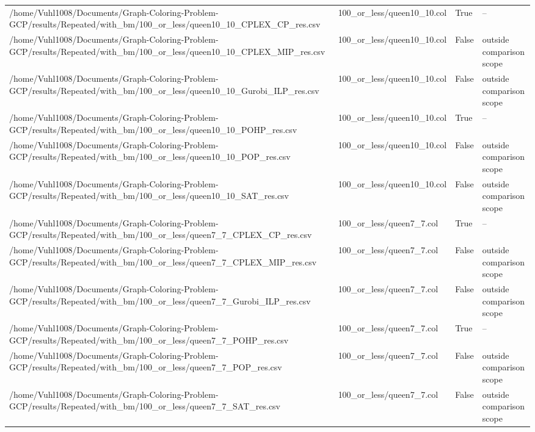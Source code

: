 \begin{table}[htbp]
\begin{tabular}{llll}
/home/Vuhl1008/Documents/Graph-Coloring-Problem-GCP/results/Repeated/with\_bm/100\_or\_less/queen10\_10\_CPLEX\_CP\_res.csv & 100\_or\_less/queen10\_10.col & True & -- \\
/home/Vuhl1008/Documents/Graph-Coloring-Problem-GCP/results/Repeated/with\_bm/100\_or\_less/queen10\_10\_CPLEX\_MIP\_res.csv & 100\_or\_less/queen10\_10.col & False & outside comparison scope \\
/home/Vuhl1008/Documents/Graph-Coloring-Problem-GCP/results/Repeated/with\_bm/100\_or\_less/queen10\_10\_Gurobi\_ILP\_res.csv & 100\_or\_less/queen10\_10.col & False & outside comparison scope \\
/home/Vuhl1008/Documents/Graph-Coloring-Problem-GCP/results/Repeated/with\_bm/100\_or\_less/queen10\_10\_POHP\_res.csv & 100\_or\_less/queen10\_10.col & True & -- \\
/home/Vuhl1008/Documents/Graph-Coloring-Problem-GCP/results/Repeated/with\_bm/100\_or\_less/queen10\_10\_POP\_res.csv & 100\_or\_less/queen10\_10.col & False & outside comparison scope \\
/home/Vuhl1008/Documents/Graph-Coloring-Problem-GCP/results/Repeated/with\_bm/100\_or\_less/queen10\_10\_SAT\_res.csv & 100\_or\_less/queen10\_10.col & False & outside comparison scope \\
/home/Vuhl1008/Documents/Graph-Coloring-Problem-GCP/results/Repeated/with\_bm/100\_or\_less/queen7\_7\_CPLEX\_CP\_res.csv & 100\_or\_less/queen7\_7.col & True & -- \\
/home/Vuhl1008/Documents/Graph-Coloring-Problem-GCP/results/Repeated/with\_bm/100\_or\_less/queen7\_7\_CPLEX\_MIP\_res.csv & 100\_or\_less/queen7\_7.col & False & outside comparison scope \\
/home/Vuhl1008/Documents/Graph-Coloring-Problem-GCP/results/Repeated/with\_bm/100\_or\_less/queen7\_7\_Gurobi\_ILP\_res.csv & 100\_or\_less/queen7\_7.col & False & outside comparison scope \\
/home/Vuhl1008/Documents/Graph-Coloring-Problem-GCP/results/Repeated/with\_bm/100\_or\_less/queen7\_7\_POHP\_res.csv & 100\_or\_less/queen7\_7.col & True & -- \\
/home/Vuhl1008/Documents/Graph-Coloring-Problem-GCP/results/Repeated/with\_bm/100\_or\_less/queen7\_7\_POP\_res.csv & 100\_or\_less/queen7\_7.col & False & outside comparison scope \\
/home/Vuhl1008/Documents/Graph-Coloring-Problem-GCP/results/Repeated/with\_bm/100\_or\_less/queen7\_7\_SAT\_res.csv & 100\_or\_less/queen7\_7.col & False & outside comparison scope \\

\end{tabular}
\end{table}
